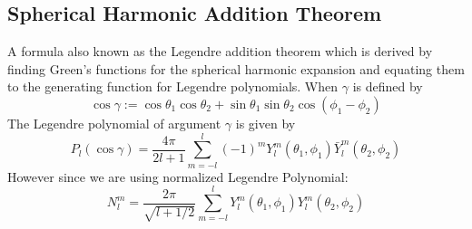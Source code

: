 \documentclass{article}
\begin{document}
\subsection{Spherical Harmonic Addition Theorem}
A formula also known as the Legendre addition theorem which is derived by finding Green's functions for the spherical harmonic expansion and equating them to the generating function for Legendre polynomials. When $\gamma$ is defined by
\begin{equation}
\cos \gamma := \cos \theta_1 \cos \theta_2 + \sin \theta_1 \sin \theta_2 \cos(\phi_1-\phi_2)
\end{equation}
The Legendre polynomial of argument $\gamma$ is given by
\begin{equation}
P_l(\cos \gamma) = \frac{4\pi}{2l+1}\sum_{m=-l}^l (-1)^m Y^m_l(\theta_1,\phi_1) \bar{Y}^m_l(\theta_2, \phi_2)
\end{equation}
However since we are using normalized Legendre Polynomial:
\begin{equation}
N_l^m = \frac{2\pi}{\sqrt{l+1/2}}\sum_{m=-l}^l Y^m_l(\theta_1,\phi_1) Y^m_l(\theta_2, \phi_2)
\end{equation}
\end{document}
